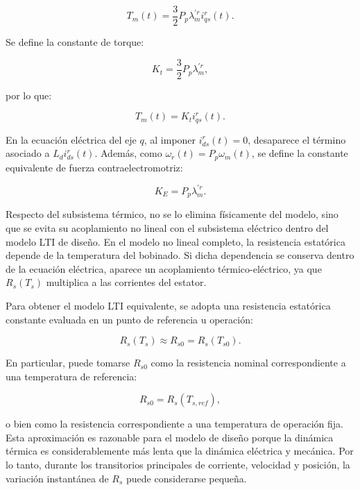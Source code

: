 \documentclass[10pt,a4paper]{article}
\begin{document}
\begin{equation*}
	T_m(t)
	=
	\frac{3}{2}P_p\lambda_m^{\prime r} i_{qs}^r(t).
\end{equation*}

Se define la constante de torque:

\begin{equation*}
	K_t = \frac{3}{2}P_p\lambda_m^{\prime r},
\end{equation*}

por lo que:

\begin{equation*}
	T_m(t)=K_t i_{qs}^r(t).
\end{equation*}

En la ecuación eléctrica del eje $q$, al imponer $i_{ds}^r(t)=0$, desaparece el término asociado a $L_d i_{ds}^r(t)$. Además, como $\omega_r(t)=P_p\omega_m(t)$, se define la constante equivalente de fuerza contraelectromotriz:

\begin{equation*}
	K_E=P_p\lambda_m^{\prime r}.
\end{equation*}

Respecto del subsistema térmico, no se lo elimina físicamente del modelo, sino que se evita su acoplamiento no lineal con el subsistema eléctrico dentro del modelo LTI de diseño. En el modelo no lineal completo, la resistencia estatórica depende de la temperatura del bobinado. Si dicha dependencia se conserva dentro de la ecuación eléctrica, aparece un acoplamiento térmico-eléctrico, ya que $R_s(T_s)$ multiplica a las corrientes del estator.

Para obtener el modelo LTI equivalente, se adopta una resistencia estatórica constante evaluada en un punto de referencia u operación:

\begin{equation*}
	R_s(T_s)\approx R_{s0}=R_s(T_{s0}).
\end{equation*}

En particular, puede tomarse $R_{s0}$ como la resistencia nominal correspondiente a una temperatura de referencia:

\begin{equation*}
	R_{s0}=R_s(T_{s,ref}),
\end{equation*}

o bien como la resistencia correspondiente a una temperatura de operación fija. Esta aproximación es razonable para el modelo de diseño porque la dinámica térmica es considerablemente más lenta que la dinámica eléctrica y mecánica. Por lo tanto, durante los transitorios principales de corriente, velocidad y posición, la variación instantánea de $R_s$ puede considerarse pequeña.
\end{document}
